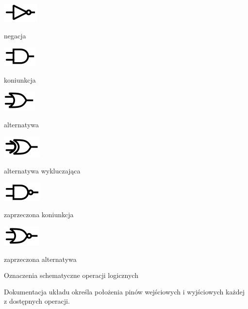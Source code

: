 \documentclass[a4paper,12pt]{article}
\begin{document}
\begin{table}[h!]
\centering
\begin{minipage}{2.5cm}
   \centering
   \includegraphics{grafika/obwody/not.png}
   \caption*{negacja}
\end{minipage}
\begin{minipage}{2.5cm}
   \centering
   \includegraphics{grafika/obwody/and.png}
   \caption*{koniunkcja}
\end{minipage}
\begin{minipage}{2.5cm}
   \centering
   \includegraphics{grafika/obwody/or.png}
   \caption*{alternatywa}
\end{minipage}
\begin{minipage}{2.5cm}
   \centering
   \includegraphics{grafika/obwody/xor.png}
   \caption*{alternatywa wykluczająca}
\end{minipage}
\begin{minipage}{2.5cm}
   \centering
   \includegraphics{grafika/obwody/nand.png}
   \caption*{zaprzeczona koniunkcja}
\end{minipage}
\begin{minipage}{2.5cm}
   \centering
   \includegraphics{grafika/obwody/nor.png}
   \caption*{zaprzeczona alternatywa}
\end{minipage}

\caption*{Oznaczenia schematyczne operacji logicznych}
\end{table}

Dokumentacja układu określa położenia pinów wejściowych i wyjściowych każdej z dostępnych operacji.
\end{document}
